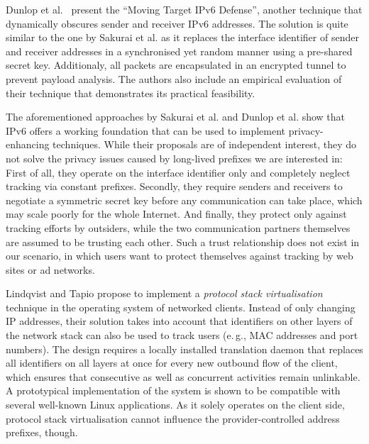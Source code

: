 \documentclass{easychair}
\begin{document}
Dunlop et al.~\cite{Dunlop:12} present the ``Moving Target IPv6 Defense'', another technique that dynamically obscures sender and receiver IPv6 addresses. The solution is quite similar to the one by Sakurai et al. as it replaces the interface identifier of sender and receiver addresses in a synchronised yet random manner using a pre-shared secret key. Additionaly, all packets are encapsulated in an encrypted tunnel to prevent payload analysis. The authors also include an empirical evaluation of their technique that demonstrates its practical feasibility.

The aforementioned approaches by Sakurai et al. and Dunlop et al. show that IPv6 offers a working foundation that can be used to implement privacy-enhancing techniques. While their proposals are of independent interest, they do not solve the privacy issues caused by long-lived prefixes we are interested in: First of all, they operate on the interface identifier only and completely neglect tracking via constant prefixes. Secondly, they require senders and receivers to negotiate a symmetric secret key before any communication can take place, which may scale poorly for the whole Internet. And finally, they protect only against tracking efforts by outsiders, while the two communication partners themselves are assumed to be trusting each other. Such a trust relationship does not exist in our scenario, in which users want to protect themselves against tracking by web sites or ad networks.

Lindqvist and Tapio \cite{Lindqvist:2008:PPP:1456403.1456416} propose to implement a \emph{protocol stack virtualisation} technique in the operating system of networked clients. Instead of only changing IP addresses, their solution takes into account that identifiers on other layers of the network stack can also be used to track users  (e.\,g., MAC addresses and port numbers). The design requires a locally installed translation daemon that replaces all identifiers on all layers at once for every new outbound flow of the client, which ensures that consecutive as well as concurrent activities remain unlinkable. A prototypical implementation of the system is shown to be compatible with several well-known Linux applications. As it solely operates on the client side, protocol stack virtualisation cannot influence the provider-controlled address prefixes, though.
\end{document}
